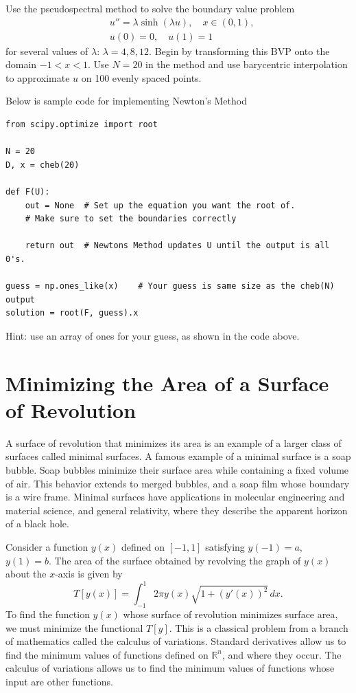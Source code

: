 \begin{problem}
Use the pseudospectral method to solve the boundary value problem
\begin{align*}
	&{ } u'' = \lambda\sinh(\lambda u), \quad x \in (0,1), \\
	&{ } u(0) = 0, \quad u(1) = 1
\end{align*}
for several values of $\lambda$: $\lambda = 4, 8, 12$.
Begin by transforming this BVP onto the domain $-1<x<1$.
Use $N=20$ in the  method and use barycentric interpolation to approximate $u$ on 100 evenly spaced points.

Below is sample code for implementing Newton's Method
\begin{lstlisting}
from scipy.optimize import root

N = 20
D, x = cheb(20)

def F(U):
	out = None	# Set up the equation you want the root of.
	# Make sure to set the boundaries correctly

	return out	# Newtons Method updates U until the output is all 0's.

guess = np.ones_like(x)    # Your guess is same size as the cheb(N) output
solution = root(F, guess).x
\end{lstlisting}

Hint: use an array of ones for your guess, as shown in the code above.
\end{problem}


\section*{Minimizing the Area of a Surface of Revolution}
A surface of revolution that minimizes its area is an example of a larger class of surfaces called minimal surfaces. A famous example of a minimal surface is a soap bubble. Soap bubbles minimize their surface area while containing a fixed volume of air. This behavior extends to merged bubbles, and a soap film whose boundary is a wire frame. Minimal surfaces have applications in molecular engineering and material science, and general relativity, where they describe the apparent horizon of a black hole.

Consider a function $y(x)$ defined on $[-1,1]$ satisfying $y(-1) = a $, $y(1) = b. $ The area of the surface obtained by revolving the graph of $y(x)$ about the $x$-axis is given by
\begin{equation*}
	T[y(x)] = \int_{-1}^1 2 \pi y(x) \sqrt{1 + (y'(x))^2}\, dx .
\end{equation*}
To find the function $y(x)$ whose surface of revolution minimizes surface area, we must minimize the functional $T[y]$.
This is a classical problem from a branch of mathematics called the calculus of variations.
Standard derivatives allow us to find the minimum values of functions defined on $\mathbb{R}^n$, and where they occur.
The calculus of variations allows us to find the minimum values of functions whose input are other functions.

